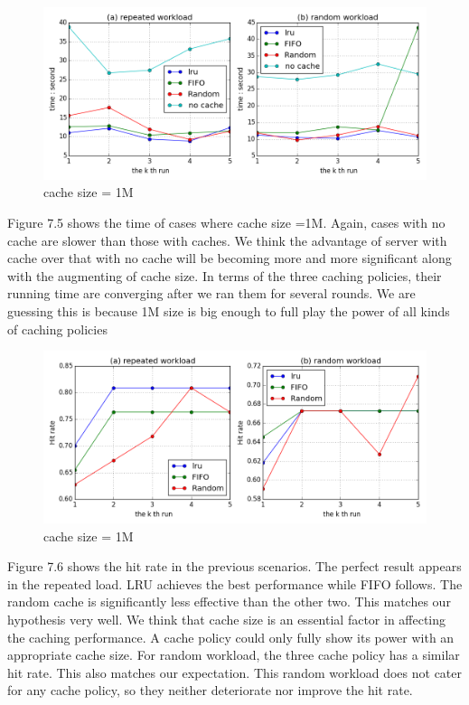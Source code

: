 \documentclass[paper=a4, fontsize=11pt]{scrartcl} %
\numberwithin{equation}{section} %
\numberwithin{figure}{section} %
\numberwithin{table}{section} %
\begin{document}
\begin{figure}[h]
  \centering
  \includegraphics[width=\textwidth]{../data/time1M}
  \caption{cache size = 1M}
  \label{fig:time1M}
\end{figure}
Figure 7.5 shows the time of cases where cache size =1M. Again, cases with no cache are slower than those with caches. We think the advantage of server with cache over that with no cache will be becoming more and more significant along with the augmenting of cache size. In terms of the three caching policies, their running time are converging after we ran them for several rounds. We are guessing this is because 1M size is big enough to full play the power of all kinds of caching policies
\begin{figure}[h]
  \centering
  \includegraphics[width=\textwidth]{../data/hit1M}
  \caption{cache size = 1M}
  \label{fig:hit1M}
\end{figure}
Figure 7.6 shows the hit rate in the previous scenarios. The perfect result appears in the repeated load. LRU achieves the best performance while FIFO follows. The random cache is significantly less effective than the other two. This matches our hypothesis very well. We think that cache size is an essential factor in affecting the caching performance. A cache policy could only fully show its power with an appropriate cache size. For random workload, the three cache policy has a similar hit rate. This also matches our expectation. This random workload does not cater for any cache policy, so they neither deteriorate nor improve the hit rate. 
\end{document}

